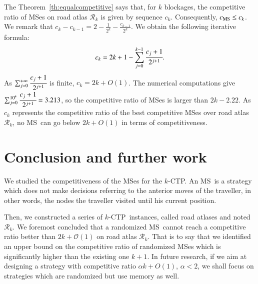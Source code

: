 \documentclass[preprint]{elsarticle}
\newcommand{\kctp}{$k$-CTP}
\newcommand{\mcalr}{\mathcal{R}}
\newcommand{\mts}{MS}
\newcommand{\cms}{c_{\mbox{\scriptsize{MS}}}}
\begin{document}
The Theorem~\ref{th:equalcompetitive} says that, for $k$ blockages, the competitive ratio of \mts es on road atlas $\mcalr_k$ is given by sequence $c_k$. Consequently, $\cms \le c_k$.
We remark that $c_k - c_{k-1} = 2 - \frac{1}{2^{k}} - \frac{c_{k-1}}{2^{k}}$.
We obtain the following iterative formula:
\[
c_k = 2k+1-\sum_{j=0}^{k-1}\cfrac{c_j+1}{2^{j+1}}.
\]
As $\sum_{j=0}^{+\infty}\cfrac{c_j+1}{2^{j+1}}$ is finite, $c_k = 2k + O(1)$. The numerical computations give $\sum_{j=0}^{10^4}\cfrac{c_j+1}{2^{j+1}} = 3.213$, so the competitive ratio of \mts es is larger than $2k-2.22$. As $c_k$ represents the competitive ratio of the best competitive \mts es over road atlas $\mcalr_k$, no \mts ~can go below $2k+O\left(1\right)$ in terms of competitiveness.
\section{Conclusion and further work} \label{sec:conclusion}

We studied the competitiveness of the \mts es for the \kctp. An \mts ~is a strategy which does not make decisions referring to the anterior moves of the traveller, in other words, the nodes the traveller visited until his current position.

Then, we constructed a series of \kctp ~instances, called road atlases and noted $\mcalr_k$. 
We foremost concluded that a randomized  \mts ~cannot reach a competitive ratio better than $2k+\mathcal{O}\left(1\right)$ on road atlas $\mcalr_k$. That is to say that we identified an upper bound on the competitive ratio of randomized \mts{}es which is significantly higher than the existing one $k+1$. In future research, if we aim at designing a strategy with competitive ratio $\alpha k + O\left(1\right)$, $\alpha < 2$, we shall focus on strategies which are randomized but use memory as well.



\end{document}
